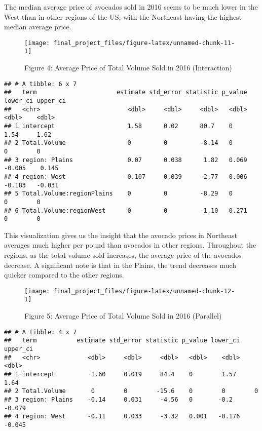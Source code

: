 \documentclass[
]{article}
\begin{document}
The median average price of avocados sold in 2016 seems to be much lower
in the West than in other regions of the US, with the Northeast having
the highest median average price.

\begin{figure}

{\centering \texttt{[image: final\_project\_files/figure-latex/unnamed-chunk-11-1]} 

}

\caption{Figure 4: Average Price of Total Volume Sold in 2016 (Interaction)}\label{fig:unnamed-chunk-11}
\end{figure}

\begin{verbatim}
## # A tibble: 6 x 7
##   term                      estimate std_error statistic p_value lower_ci upper_ci
##   <chr>                        <dbl>     <dbl>     <dbl>   <dbl>    <dbl>    <dbl>
## 1 intercept                    1.58      0.02      80.7    0        1.54     1.62 
## 2 Total.Volume                 0         0         -8.14   0        0        0    
## 3 region: Plains               0.07      0.038      1.82   0.069   -0.005    0.145
## 4 region: West                -0.107     0.039     -2.77   0.006   -0.183   -0.031
## 5 Total.Volume:regionPlains    0         0         -8.29   0        0        0    
## 6 Total.Volume:regionWest      0         0         -1.10   0.271    0        0
\end{verbatim}

This visualization gives us the insight that the avocado prices in
Northeast averages much higher per pound than avocados in other regions.
Throughout the regions, as the total volume sold increases, the average
price of the avocados decrease. A significant note is that in the
Plains, the trend decreases much quicker compared to the other regions.

\begin{figure}

{\centering \texttt{[image: final\_project\_files/figure-latex/unnamed-chunk-12-1]} 

}

\caption{Figure 5: Average Price of Total Volume Sold in 2016 (Parallel)}\label{fig:unnamed-chunk-12}
\end{figure}

\begin{verbatim}
## # A tibble: 4 x 7
##   term           estimate std_error statistic p_value lower_ci upper_ci
##   <chr>             <dbl>     <dbl>     <dbl>   <dbl>    <dbl>    <dbl>
## 1 intercept          1.60     0.019     84.4    0        1.57     1.64 
## 2 Total.Volume       0        0        -15.6    0        0        0    
## 3 region: Plains    -0.14     0.031     -4.56   0       -0.2     -0.079
## 4 region: West      -0.11     0.033     -3.32   0.001   -0.176   -0.045
\end{verbatim}
\end{document}

